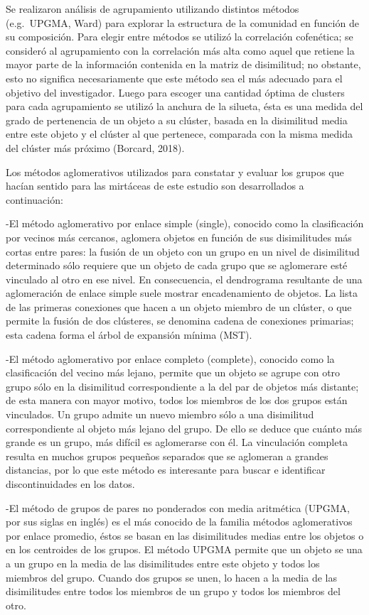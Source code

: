 \documentclass[11pt,]{article}
\begin{document}
Se realizaron análisis de agrupamiento utilizando distintos métodos
(e.g.~UPGMA, Ward) para explorar la estructura de la comunidad en
función de su composición. Para elegir entre métodos se utilizó la
correlación cofenética; se consideró al agrupamiento con la correlación
más alta como aquel que retiene la mayor parte de la información
contenida en la matriz de disimilitud; no obstante, esto no significa
necesariamente que este método sea el más adecuado para el objetivo del
investigador. Luego para escoger una cantidad óptima de clusters para
cada agrupamiento se utilizó la anchura de la silueta, ésta es una
medida del grado de pertenencia de un objeto a su clúster, basada en la
disimilitud media entre este objeto y el clúster al que pertenece,
comparada con la misma medida del clúster más próximo (Borcard, 2018).

Los métodos aglomerativos utilizados para constatar y evaluar los grupos
que hacían sentido para las mirtáceas de este estudio son desarrollados
a continuación:

-El método aglomerativo por enlace simple (single), conocido como la
clasificación por vecinos más cercanos, aglomera objetos en función de
sus disimilitudes más cortas entre pares: la fusión de un objeto con un
grupo en un nivel de disimilitud determinado sólo requiere que un objeto
de cada grupo que se aglomerare esté vinculado al otro en ese nivel. En
consecuencia, el dendrograma resultante de una aglomeración de enlace
simple suele mostrar encadenamiento de objetos. La lista de las primeras
conexiones que hacen a un objeto miembro de un clúster, o que permite la
fusión de dos clústeres, se denomina cadena de conexiones primarias;
esta cadena forma el árbol de expansión mínima (MST).

-El método aglomerativo por enlace completo (complete), conocido como la
clasificación del vecino más lejano, permite que un objeto se agrupe con
otro grupo sólo en la disimilitud correspondiente a la del par de
objetos más distante; de esta manera con mayor motivo, todos los
miembros de los dos grupos están vinculados. Un grupo admite un nuevo
miembro sólo a una disimilitud correspondiente al objeto más lejano del
grupo. De ello se deduce que cuánto más grande es un grupo, más difícil
es aglomerarse con él. La vinculación completa resulta en muchos grupos
pequeños separados que se aglomeran a grandes distancias, por lo que
este método es interesante para buscar e identificar discontinuidades en
los datos.

-El método de grupos de pares no ponderados con media aritmética (UPGMA,
por sus siglas en inglés) es el más conocido de la familia métodos
aglomerativos por enlace promedio, éstos se basan en las disimilitudes
medias entre los objetos o en los centroides de los grupos. El método
UPGMA permite que un objeto se una a un grupo en la media de las
disimilitudes entre este objeto y todos los miembros del grupo. Cuando
dos grupos se unen, lo hacen a la media de las disimilitudes entre todos
los miembros de un grupo y todos los miembros del otro.
\end{document}
